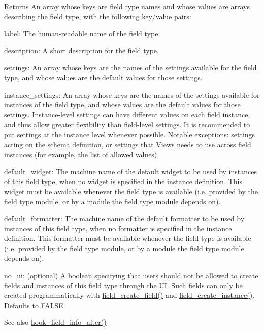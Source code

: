 \begin{DoxyReturn}{Returns}
An array whose keys are field type names and whose values are arrays describing the field type, with the following key/value pairs:
\begin{DoxyItemize}
\item label: The human-\/readable name of the field type.
\item description: A short description for the field type.
\item settings: An array whose keys are the names of the settings available for the field type, and whose values are the default values for those settings.
\item instance\_\-settings: An array whose keys are the names of the settings available for instances of the field type, and whose values are the default values for those settings. Instance-\/level settings can have different values on each field instance, and thus allow greater flexibility than field-\/level settings. It is recommended to put settings at the instance level whenever possible. Notable exceptions: settings acting on the schema definition, or settings that Views needs to use across field instances (for example, the list of allowed values).
\item default\_\-widget: The machine name of the default widget to be used by instances of this field type, when no widget is specified in the instance definition. This widget must be available whenever the field type is available (i.e. provided by the field type module, or by a module the field type module depends on).
\item default\_\-formatter: The machine name of the default formatter to be used by instances of this field type, when no formatter is specified in the instance definition. This formatter must be available whenever the field type is available (i.e. provided by the field type module, or by a module the field type module depends on).
\item no\_\-ui: (optional) A boolean specifying that users should not be allowed to create fields and instances of this field type through the UI. Such fields can only be created programmatically with \hyperlink{group__field__crud_ga0f879889d2da2b5d638252d7eb027746}{field\_\-create\_\-field()} and \hyperlink{group__field__crud_ga3a1e23613d572a6e908e063c3a0335f8}{field\_\-create\_\-instance()}. Defaults to FALSE.
\end{DoxyItemize}
\end{DoxyReturn}
\begin{DoxySeeAlso}{See also}
\hyperlink{group__field__types_ga62d5e308d07e62b096d13714ae42335f}{hook\_\-field\_\-info\_\-alter()} 
\end{DoxySeeAlso}
